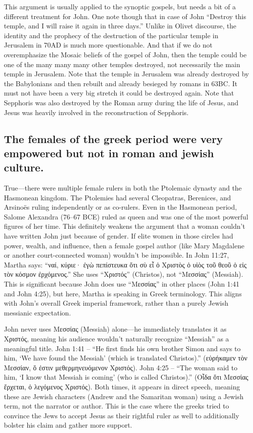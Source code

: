 This argument is usually applied to the synoptic gospels, but needs a bit of a different treatment for John.
One note though that in case of John ``Destroy this temple, and I will raise it again in three days.'' Unlike in Olivet discourse, the identity and the prophecy of the destruction of the particular temple in Jerusalem in 70AD is much more questionable.
And that if we do not overemphasize the Mosaic beliefs of the gospel of John, then the temple could be one of the many many many other temples destroyed, not necessarily the main temple in Jerusalem.
Note that the temple in Jerusalem was already destroyed by the Babylonians and then rebuilt and already besieged by romans in 63BC.
It must not have been a very big stretch it could be destroyed again.
Note that Sepphoris was also destroyed by the Roman army during the life of Jesus, and Jesus was heavily involved in the reconstruction of Sepphoris.

\subsection{The females of the greek period were very empowered but not in roman and jewish culture.}\label{subsec:the-females-of-the-greek-period-were-very-empowered-but-not-in-roman-and-jewish-culture.}

True---there were multiple female rulers in both the Ptolemaic dynasty and the Hasmonean kingdom.
The Ptolemies had several Cleopatras, Berenices, and Arsinoës ruling independently or as co-rulers.
Even in the Hasmonean period, Salome Alexandra (76--67 BCE) ruled as queen and was one of the most powerful figures of her time.
This definitely weakens the argument that a woman couldn't have written John just because of gender.
If elite women in those circles had power, wealth, and influence, then a female gospel author (like Mary Magdalene or another court-connected woman) wouldn't be impossible.
In John 11:27, Martha says: ``ναί, κύριε· ἐγὼ πεπίστευκα ὅτι σὺ εἶ ὁ Χριστὸς ὁ υἱὸς τοῦ θεοῦ ὁ εἰς τὸν κόσμον ἐρχόμενος.'' She uses ``Χριστός'' (Christos), not ``Μεσσίας'' (Messiah).
This is significant because John does use ``Μεσσίας'' in other places (John 1:41 and John 4:25), but here, Martha is speaking in Greek terminology.
This aligns with John's overall Greek imperial framework, rather than a purely Jewish messianic expectation.

John never uses Μεσσίας (Messiah) alone---he immediately translates it as Χριστός, meaning his audience wouldn't naturally recognize ``Messiah'' as a meaningful title.
John 1:41 -- ``He first finds his own brother Simon and says to him, `We have found the Messiah' (which is translated Christos).'' (εὑρήκαμεν τὸν Μεσσίαν, ὅ ἐστιν μεθερμηνευόμενον Χριστός).
John 4:25 -- ``The woman said to him, `I know that Messiah is coming' (who is called Christos).'' (Οἶδα ὅτι Μεσσίας ἔρχεται, ὁ λεγόμενος Χριστός).
Both times, it appears in direct speech, meaning these are Jewish characters (Andrew and the Samaritan woman) using a Jewish term, not the narrator or author.
This is the case where the greeks tried to convince the Jews to accept Jesus as their rightful ruler as well to additionally bolster his claim and gather more support.

